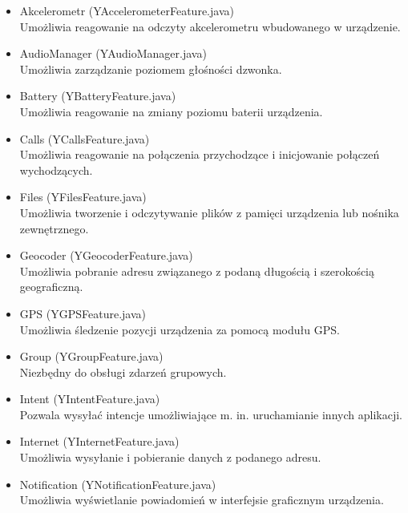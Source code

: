 \documentclass[11pt,a4paper,polish,thesis]{dcsbook}
\begin{document}
\begin{itemize}
\item{Akcelerometr (YAccelerometerFeature.java)} \\
Umożliwia reagowanie na odczyty akcelerometru wbudowanego w urządzenie. 

\item{AudioManager (YAudioManager.java)}\\
Umożliwia zarządzanie poziomem głośności dzwonka.

\item{Battery (YBatteryFeature.java)}\\
Umożliwia reagowanie na zmiany poziomu baterii urządzenia.

\item{Calls (YCallsFeature.java)}\\
Umożliwia reagowanie na połączenia przychodzące i inicjowanie połączeń wychodzących.

\item{Files (YFilesFeature.java)}\\
Umożliwia tworzenie i odczytywanie plików z pamięci urządzenia lub nośnika zewnętrznego.

\item{Geocoder (YGeocoderFeature.java)}\\
Umożliwia pobranie adresu związanego z podaną długością i szerokością geograficzną.

\item{GPS (YGPSFeature.java)}\\
Umożliwia śledzenie pozycji urządzenia za pomocą modułu GPS.

\item{Group (YGroupFeature.java)}\\
Niezbędny do obsługi zdarzeń grupowych.

\item{Intent (YIntentFeature.java)}\\
Pozwala wysyłać intencje\cite{android.intent} umożliwiające m. in. uruchamianie innych aplikacji.

\item{Internet (YInternetFeature.java)}\\
Umożliwia wysyłanie i pobieranie danych z podanego adresu.

\item{Notification (YNotificationFeature.java)}\\
Umożliwia wyświetlanie powiadomień w interfejsie graficznym urządzenia.


\end{itemize}
\end{document}
